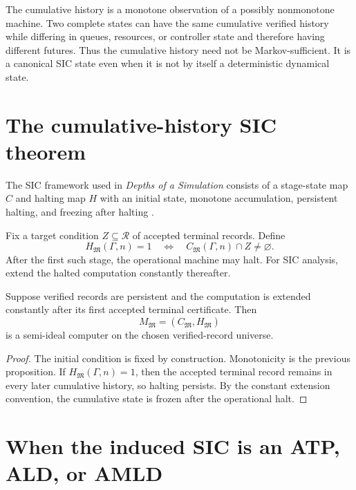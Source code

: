 \begin{remark}
The cumulative history is a monotone observation of a possibly nonmonotone machine. Two complete states can have the same cumulative verified history while differing in queues, resources, or controller state and therefore having different futures. Thus the cumulative history need not be Markov-sufficient. It is a canonical SIC state even when it is not by itself a deterministic dynamical state.
\end{remark}

\section{The cumulative-history SIC theorem}
The SIC framework used in \emph{Depths of a Simulation} consists of a stage-state map $C$ and halting map $H$ with an initial state, monotone accumulation, persistent halting, and freezing after halting \cite{depths}.

\begin{definition}
Fix a target condition $Z\subseteq\mathcal R$ of accepted terminal records. Define
\[
H_{\mathfrak M}(\Gamma,n)=1
\quad\Longleftrightarrow\quad
C_{\mathfrak M}(\Gamma,n)\cap Z\neq\varnothing.
\]
After the first such stage, the operational machine may halt. For SIC analysis, extend the halted computation constantly thereafter.
\end{definition}

\begin{theorem}
Suppose verified records are persistent and the computation is extended constantly after its first accepted terminal certificate. Then
\[
M_{\mathfrak M}=(C_{\mathfrak M},H_{\mathfrak M})
\]
is a semi-ideal computer on the chosen verified-record universe.
\end{theorem}
\begin{proof}
The initial condition is fixed by construction. Monotonicity is the previous proposition. If $H_{\mathfrak M}(\Gamma,n)=1$, then the accepted terminal record remains in every later cumulative history, so halting persists. By the constant extension convention, the cumulative state is frozen after the operational halt.
\end{proof}

\section{When the induced SIC is an ATP, ALD, or AMLD}
